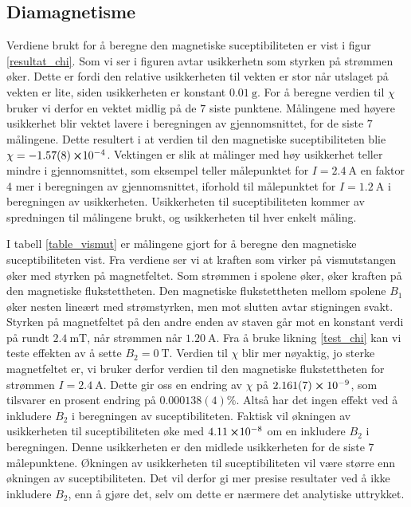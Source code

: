 \documentclass[%
 reprint,
 amsmath,amssymb,
 aps,
 norsk,
]{revtex4-1}
\begin{document}
\subsection{Diamagnetisme}
Verdiene brukt for å beregne den magnetiske suceptibiliteten er vist i figur \vref{resultat_chi}. Som vi ser i figuren avtar usikkerhetn som styrken på strømmen øker. Dette er fordi den relative usikkerheten til vekten er stor når utslaget på vekten er lite, siden usikkerheten er konstant $\SI{0.01}{\gram}$. For å beregne verdien til $\chi$ bruker vi derfor en vektet midlig på de $7$ siste punktene. Målingene med høyere usikkerhet blir vektet lavere i beregningen av gjennomsnittet, for de siste $7$ målingene. Dette resultert i at verdien til den magnetiske suceptibiliteten blie $\chi = -\SI{1.57\pm0.08}\cross 10^{-4}$. Vektingen er slik at målinger med høy usikkerhet teller mindre i gjennomsnittet, som eksempel teller målepunktet for $I=\SI{2.4}{\ampere}$ en faktor 4 mer i beregningen av gjennomsnittet, iforhold til målepunktet for $I=\SI{1.2}{\ampere}$ i beregningen av usikkerheten. Usikkerheten til suceptibiliteten kommer av spredningen til målingene brukt, og usikkerheten til hver enkelt måling.\par
I tabell \vref{table_vismut} er målingene gjort for å beregne den magnetiske suceptibiliteten vist. Fra verdiene ser vi at kraften som virker på vismutstangen øker med styrken på magnetfeltet. Som strømmen i spolene øker, øker kraften på den magnetiske flukstettheten. Den magnetiske flukstettheten mellom spolene $B_1$ øker nesten lineært med strømstyrken, men mot slutten avtar stigningen svakt. Styrken på magnetfeltet på den andre enden av staven går mot en konstant verdi på rundt $\SI{2.4}{\milli\tesla}$, når strømmen når $\SI{1.20}{\ampere}$. Fra å bruke likning \eqref{test_chi} kan vi teste effekten av å sette $B_2=\SI{0}{\tesla}$. Verdien til $\chi$ blir mer nøyaktig, jo sterke magnetfeltet er, vi bruker derfor verdien til den magnetiske flukstettheten for strømmen $I=\SI{2.4}{\ampere}$. Dette gir oss en endring av $\chi$
på $2.161(7)\cross10^{-9}$, som tilsvarer en prosent endring på $0.000138(4)\%$. Altså har det ingen effekt ved å inkludere $B_2$ i beregningen av suceptibiliteten. Faktisk vil økningen av usikkerheten til suceptibiliteten øke med $\SI{4.11}\cross 10^{-8}$ om en inkludere $B_2$ i beregningen. Denne usikkerheten er den midlede usikkerheten for de siste $7$ målepunktene. Økningen av usikkerheten til suceptibiliteten vil være større enn økningen av suceptibiliteten. Det vil derfor gi mer presise resultater ved å ikke inkludere $B_2$, enn å gjøre det, selv om dette er nærmere det analytiske uttrykket. \\
\end{document}

